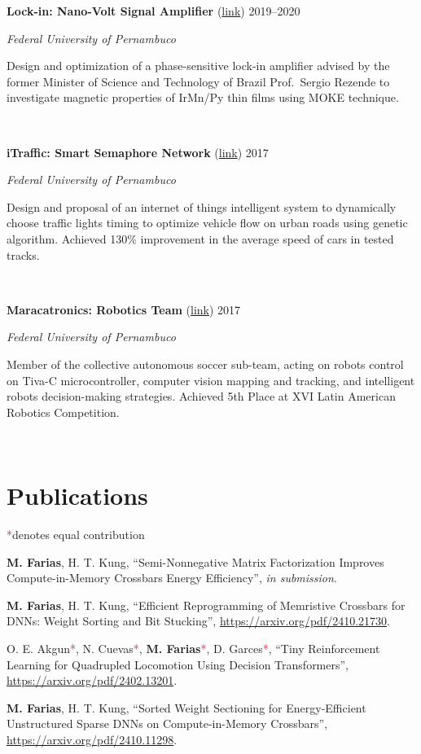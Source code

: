 \documentclass[letterpaper,10pt]{article}
\newcommand{\entry}[4]{

\begin{minipage}[t]{.15\textwidth}
\end{minipage}
\hfill\vline\hfill 
\begin{minipage}[t]{0.95\textwidth}
#2 \hfill \textsc{#1}

\textit{#3}

\footnotesize{#4}
\end{minipage}\\\vspace{.25cm}}
\newcommand{\ufpe}{Federal University of Pernambuco}
\newcommand{\co}{\textcolor{crimson}{*}}
\begin{document}
\entry{2019--2020}{\textbf{Lock-in: Nano-Volt Signal Amplifier} (\href{https://www.matheussfarias.com/lockin.html}{link})}{\ufpe}{
	Design and optimization of a phase-sensitive lock-in amplifier advised by the former Minister of Science and Technology of Brazil Prof.\ Sergio Rezende to investigate magnetic properties of IrMn/Py thin films using MOKE technique.
}

\entry{2017}{\textbf{iTraffic: Smart Semaphore Network} (\href{https://www.matheussfarias.com/itraffic.html}{link})}{\ufpe}{
	Design and proposal of an internet of things intelligent system to dynamically choose traffic lights timing to optimize vehicle flow on urban roads using genetic algorithm. Achieved 130\% improvement in the average speed of cars in tested tracks.
}

\entry{2017}{\textbf{Maracatronics: Robotics Team} (\href{https://www.matheussfarias.com/maracatronics.html}{link})}{\ufpe}{
	Member of the collective autonomous soccer sub-team, acting on robots control on Tiva-C microcontroller, computer vision mapping and tracking, and intelligent robots decision-making strategies. Achieved 5th Place at XVI Latin American Robotics Competition.
}

\vspace*{-.25cm}

\section{Publications}
\co denotes equal contribution
\vspace*{.1cm}
\begin{etaremune}
	\renewcommand{\labelenumi}{[\theenumi]}
    \item \textbf{M. Farias}, H. T. Kung, ``Semi-Nonnegative Matrix Factorization Improves Compute-in-Memory Crossbars Energy Efficiency'', \textit{in submission}.
	\item \textbf{M. Farias}, H. T. Kung, ``Efficient Reprogramming of Memristive Crossbars for DNNs: Weight Sorting and Bit Stucking'', \href{https://arxiv.org/pdf/2410.21730}{https://arxiv.org/pdf/2410.21730}.
    \item O. E. Akgun\co, N. Cuevas\co, \textbf{M. Farias}\co, D. Garces\co, ``Tiny Reinforcement Learning for Quadrupled Locomotion Using Decision Transformers'', \href{https://arxiv.org/pdf/2402.13201}{https://arxiv.org/pdf/2402.13201}.
	\item \textbf{M. Farias}, H. T. Kung, ``Sorted Weight Sectioning for Energy-Efficient Unstructured Sparse DNNs on Compute-in-Memory Crossbars'', \href{https://arxiv.org/pdf/2410.11298}{https://arxiv.org/pdf/2410.11298}.
\end{etaremune}
\vspace*{-.25cm}
\end{document}
